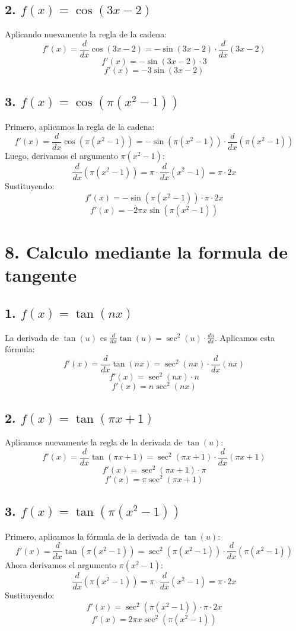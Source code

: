 \documentclass{article}
\begin{document}
\subsection*{2. $f(x) = \cos(3x - 2)$}
Aplicando nuevamente la regla de la cadena:
\[
f'(x) = \frac{d}{dx} \cos(3x - 2) = -\sin(3x - 2) \cdot \frac{d}{dx}(3x - 2)
\]
\[
f'(x) = -\sin(3x - 2) \cdot 3
\]
\[
f'(x) = -3\sin(3x - 2)
\]

\subsection*{3. $f(x) = \cos\left(\pi \left(x^2 - 1\right)\right)$}
Primero, aplicamos la regla de la cadena:
\[
f'(x) = \frac{d}{dx} \cos\left(\pi \left(x^2 - 1\right)\right) = -\sin\left(\pi \left(x^2 - 1\right)\right) \cdot \frac{d}{dx}\left(\pi \left(x^2 - 1\right)\right)
\]
Luego, derivamos el argumento $\pi (x^2 - 1)$:
\[
\frac{d}{dx}\left(\pi \left(x^2 - 1\right)\right) = \pi \cdot \frac{d}{dx}\left(x^2 - 1\right) = \pi \cdot 2x
\]
Sustituyendo:
\[
f'(x) = -\sin\left(\pi \left(x^2 - 1\right)\right) \cdot \pi \cdot 2x
\]
\[
f'(x) = -2\pi x \sin\left(\pi \left(x^2 - 1\right)\right)
\]


\section*{8. Calculo mediante la formula de tangente}

\subsection*{1. $f(x) = \tan(nx)$}
La derivada de $\tan(u)$ es $\frac{d}{dx}\tan(u) = \sec^2(u) \cdot \frac{du}{dx}$. Aplicamos esta fórmula:
\[
f'(x) = \frac{d}{dx} \tan(nx) = \sec^2(nx) \cdot \frac{d}{dx}(nx)
\]
\[
f'(x) = \sec^2(nx) \cdot n
\]
\[
f'(x) = n \sec^2(nx)
\]

\subsection*{2. $f(x) = \tan(\pi x + 1)$}
Aplicamos nuevamente la regla de la derivada de $\tan(u)$:
\[
f'(x) = \frac{d}{dx} \tan(\pi x + 1) = \sec^2(\pi x + 1) \cdot \frac{d}{dx}(\pi x + 1)
\]
\[
f'(x) = \sec^2(\pi x + 1) \cdot \pi
\]
\[
f'(x) = \pi \sec^2(\pi x + 1)
\]

\subsection*{3. $f(x) = \tan\left(\pi \left(x^2 - 1\right)\right)$}
Primero, aplicamos la fórmula de la derivada de $\tan(u)$:
\[
f'(x) = \frac{d}{dx} \tan\left(\pi \left(x^2 - 1\right)\right) = \sec^2\left(\pi \left(x^2 - 1\right)\right) \cdot \frac{d}{dx}\left(\pi \left(x^2 - 1\right)\right)
\]
Ahora derivamos el argumento $\pi (x^2 - 1)$:
\[
\frac{d}{dx}\left(\pi \left(x^2 - 1\right)\right) = \pi \cdot \frac{d}{dx}(x^2 - 1) = \pi \cdot 2x
\]
Sustituyendo:
\[
f'(x) = \sec^2\left(\pi \left(x^2 - 1\right)\right) \cdot \pi \cdot 2x
\]
\[
f'(x) = 2\pi x \sec^2\left(\pi \left(x^2 - 1\right)\right)
\]
\end{document}
